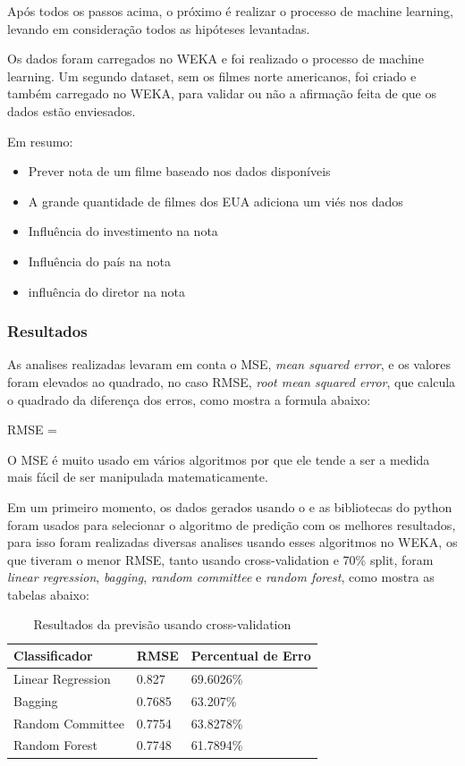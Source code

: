 Após todos os passos acima, o próximo é realizar o processo de machine learning, levando em consideração todos as hipóteses levantadas. 

Os dados foram carregados no WEKA e foi realizado o processo de machine learning. Um segundo dataset, sem os filmes norte americanos, foi criado e também carregado no WEKA, para validar ou não a afirmação feita de que os dados estão enviesados. 

Em resumo:

\begin{itemize}
    \item Prever nota de um filme baseado nos dados disponíveis
    \item A grande quantidade de filmes dos EUA adiciona um viés nos dados
    \item Influência do investimento na nota
    \item Influência do país na nota
    \item influência do diretor na nota
\end{itemize}

\subsubsection{Resultados}
As analises realizadas levaram em conta o MSE, \textit{mean squared error}, e os valores foram elevados ao quadrado, no caso RMSE, \textit{root mean squared error}, que calcula o quadrado da diferença dos erros, como mostra a formula abaixo:

 RMSE = 
 
O MSE é muito usado em vários algoritmos por que ele tende a ser a medida mais fácil de ser manipulada matematicamente.

Em um primeiro momento, os dados gerados usando o \pdi e as bibliotecas do python foram usados para selecionar o algoritmo de predição com os melhores resultados, para isso foram realizadas diversas analises usando esses algoritmos no WEKA, os que tiveram o menor RMSE, tanto usando cross-validation e 70\% split, foram \textit{linear regression}, \textit{bagging}, \textit{random committee} e \textit{random forest}, como mostra as tabelas abaixo:

\begin{longtable}{|l|l|l|}
\caption{Resultados da previsão usando cross-validation}
\\ \hline
\textbf{Classificador} & \textbf{RMSE} & \textbf{Percentual de Erro} \\ \hline
Linear Regression      & 0.827         & 69.6026\%                   \\ \hline
Bagging                & 0.7685        & 63.207\%                    \\ \hline
Random Committee       & 0.7754        & 63.8278\%                     \\ \hline
Random Forest          & 0.7748        & 61.7894\%                     \\ \hline
\end{longtable}


